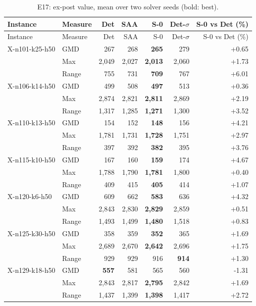 \begin{small}
\begin{longtable}{llrrrrr}
\caption{E17: ex-post value, mean over two solver seeds (bold: best).}\label{tab:app_e17}\\
\toprule
Instance & Measure & Det & SAA & S-0 & Det-$\sigma$ & S-0 vs Det (\%)\\
\midrule
\endfirsthead
\toprule
Instance & Measure & Det & SAA & S-0 & Det-$\sigma$ & S-0 vs Det (\%)\\
\midrule
\endhead
\bottomrule
\endfoot
X-n101-k25-h50 & GMD & 267 & 268 & \textbf{265} & 279 & +0.65 \\
 & Max & 2,049 & 2,027 & \textbf{2,013} & 2,060 & +1.73 \\
 & Range & 755 & 731 & \textbf{709} & 767 & +6.01 \\
X-n106-k14-h50 & GMD & 499 & 508 & \textbf{497} & 513 & +0.36 \\
 & Max & 2,874 & 2,821 & \textbf{2,811} & 2,869 & +2.19 \\
 & Range & 1,317 & 1,285 & \textbf{1,271} & 1,300 & +3.52 \\
X-n110-k13-h50 & GMD & 154 & 152 & \textbf{148} & 156 & +4.21 \\
 & Max & 1,781 & 1,731 & \textbf{1,728} & 1,751 & +2.97 \\
 & Range & 397 & 392 & \textbf{382} & 395 & +3.76 \\
X-n115-k10-h50 & GMD & 167 & 160 & \textbf{159} & 174 & +4.67 \\
 & Max & 1,788 & 1,790 & \textbf{1,781} & 1,800 & +0.40 \\
 & Range & 409 & 415 & \textbf{405} & 414 & +1.07 \\
X-n120-k6-h50 & GMD & 609 & 662 & \textbf{583} & 636 & +4.32 \\
 & Max & 2,843 & 2,830 & \textbf{2,829} & 2,859 & +0.51 \\
 & Range & 1,493 & 1,499 & \textbf{1,480} & 1,518 & +0.83 \\
X-n125-k30-h50 & GMD & 358 & 359 & \textbf{352} & 365 & +1.69 \\
 & Max & 2,689 & 2,670 & \textbf{2,642} & 2,696 & +1.75 \\
 & Range & 929 & 929 & 916 & \textbf{914} & +1.30 \\
X-n129-k18-h50 & GMD & \textbf{557} & 581 & 565 & 560 & -1.31 \\
 & Max & 2,843 & 2,817 & \textbf{2,795} & 2,842 & +1.69 \\
 & Range & 1,437 & 1,399 & \textbf{1,398} & 1,417 & +2.72 \\

\end{longtable}
\end{small}
